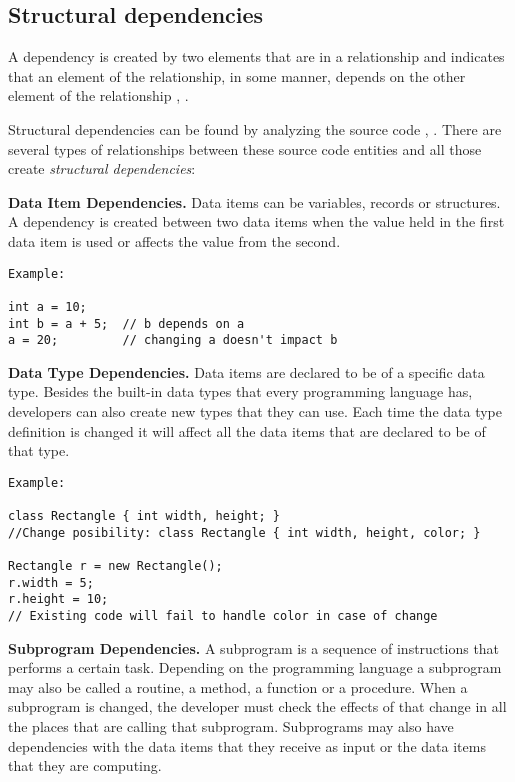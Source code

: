 \subsection{Structural dependencies}
\hspace{4em} A dependency is created by two elements that are in a relationship and indicates that an element of the relationship, in some manner, depends on the other element of the relationship \cite{Booch:2004:OAD:975416}, \cite{Cataldo2009SoftwareDW}.

Structural dependencies can be found by analyzing the source code \cite{Sangal:2005:UDM:1094811.1094824}, \cite{CalloArias2011}. 
There are several types of relationships between these source code entities and all those create \textit{structural dependencies}:

\textbf{Data Item Dependencies.}
Data items can be variables, records or structures. A dependency is created between two data items when the value held in the first data item is used or affects the value from the second.


\begin{verbatim}
Example:

int a = 10;
int b = a + 5;  // b depends on a
a = 20;         // changing a doesn't impact b
\end{verbatim}

\textbf{Data Type Dependencies.}
Data items are declared to be of a specific data type. Besides the built-in data types that every programming language has, developers can also create new types that they can use. Each time the data type definition is changed it will affect all the data items that are declared to be of that type. 


\begin{verbatim}
Example:

class Rectangle { int width, height; }
//Change posibility: class Rectangle { int width, height, color; }

Rectangle r = new Rectangle();  
r.width = 5;
r.height = 10;
// Existing code will fail to handle color in case of change
\end{verbatim}

\textbf{Subprogram Dependencies.}
A subprogram is a sequence of instructions that performs a certain task. Depending on the programming language a subprogram may also be called a routine, a method, a function or a procedure. When a subprogram is changed, the developer must check the effects of that change in all the places that are calling that subprogram. Subprograms may also have dependencies with the data items that they receive as input or the data items that they are computing.


